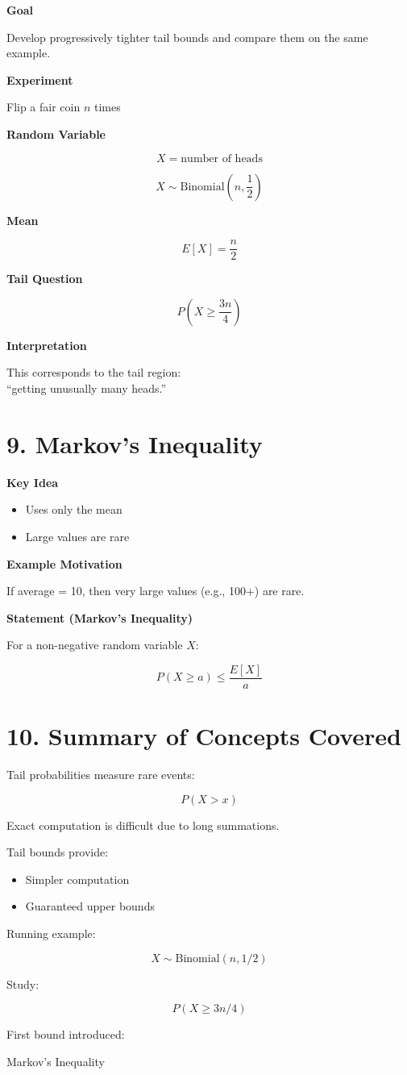 \documentclass[12pt]{article}
\begin{document}
\textbf{Goal}

Develop progressively tighter tail bounds and compare them on the same example.

\textbf{Experiment}

Flip a fair coin $n$ times

\textbf{Random Variable}

\[
X = \text{number of heads}
\]

\[
X \sim \text{Binomial}\left(n, \frac{1}{2}\right)
\]

\textbf{Mean}

\[
E[X] = \frac{n}{2}
\]

\textbf{Tail Question}

\[
P\left(X \geq \frac{3n}{4}\right)
\]

\textbf{Interpretation}

This corresponds to the tail region: \\
``getting unusually many heads.''

\section*{9. Markov’s Inequality}

\textbf{Key Idea}

\begin{itemize}
\item Uses only the mean
\item Large values are rare
\end{itemize}

\textbf{Example Motivation}

If average = 10, then very large values (e.g., 100+) are rare.

\textbf{Statement (Markov’s Inequality)}

For a non-negative random variable $X$:

\[
P(X \geq a) \leq \frac{E[X]}{a}
\]

\section*{10. Summary of Concepts Covered}

Tail probabilities measure rare events:

\[
P(X > x)
\]

Exact computation is difficult due to long summations.

Tail bounds provide:

\begin{itemize}
\item Simpler computation
\item Guaranteed upper bounds
\end{itemize}

Running example:

\[
X \sim \text{Binomial}(n, 1/2)
\]

Study:

\[
P(X \geq 3n/4)
\]

First bound introduced:

Markov’s Inequality
\end{document}
